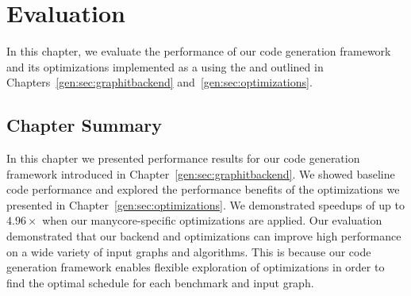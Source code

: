 \chapter{Evaluation}\label{sec:eval}

In this chapter, we evaluate the performance of our code generation framework and its optimizations implemented as a \graphvm using the \ugc and outlined in Chapters~\ref{gen:sec:graphitbackend} and~\ref{gen:sec:optimizations}.




\section{Chapter Summary}

In this chapter we presented performance results for our code generation framework introduced in Chapter~\ref{gen:sec:graphitbackend}.
We showed baseline code performance and explored the performance benefits of the optimizations we presented in Chapter~\ref{gen:sec:optimizations}.
We demonstrated speedups of up to $4.96\times$ when our manycore-specific optimizations are applied.
Our evaluation demonstrated that our \graphit backend and optimizations can improve high performance on a wide variety of input graphs and algorithms.
This is because our code generation framework enables flexible exploration of optimizations in order to find the optimal schedule for each benchmark and input graph.